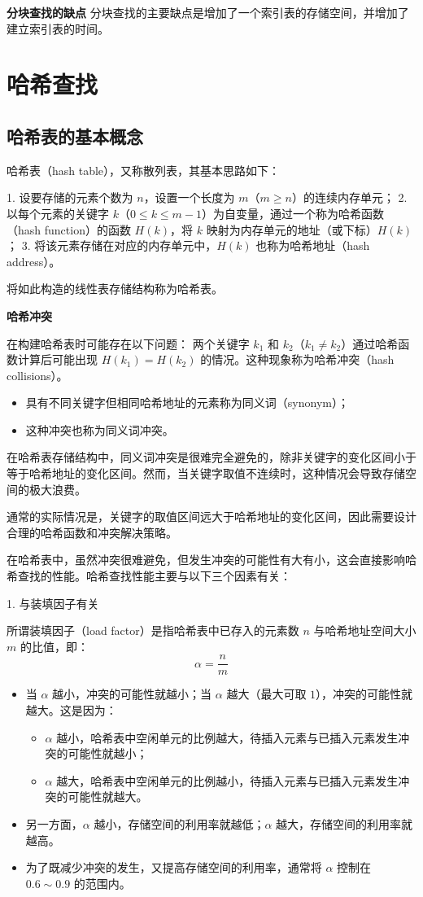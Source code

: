 \documentclass[lang=cn,newtx,10pt,scheme=chinese]{../elegantbook}
\begin{document}
\textbf{分块查找的缺点}  
分块查找的主要缺点是增加了一个索引表的存储空间，并增加了建立索引表的时间。
\section{哈希查找}
\subsection{哈希表的基本概念}

哈希表（hash table），又称散列表，其基本思路如下：

1. 设要存储的元素个数为 $n$，设置一个长度为 $m$（$m \geq n$）的连续内存单元；
2. 以每个元素的关键字 $k$（$0 \leq k \leq m-1$）为自变量，通过一个称为哈希函数（hash function）的函数 $H(k)$，将 $k$ 映射为内存单元的地址（或下标）$H(k)$；
3. 将该元素存储在对应的内存单元中，$H(k)$ 也称为哈希地址（hash address）。

将如此构造的线性表存储结构称为哈希表。


\textbf{哈希冲突}  

在构建哈希表时可能存在以下问题：  
两个关键字 $k_1$ 和 $k_2$（$k_1 \neq k_2$）通过哈希函数计算后可能出现 $H(k_1) = H(k_2)$ 的情况。这种现象称为哈希冲突（hash collisions）。  
\begin{itemize}
  \item 具有不同关键字但相同哈希地址的元素称为同义词（synonym）；
  \item 这种冲突也称为同义词冲突。
\end{itemize}

在哈希表存储结构中，同义词冲突是很难完全避免的，除非关键字的变化区间小于等于哈希地址的变化区间。然而，当关键字取值不连续时，这种情况会导致存储空间的极大浪费。

通常的实际情况是，关键字的取值区间远大于哈希地址的变化区间，因此需要设计合理的哈希函数和冲突解决策略。

在哈希表中，虽然冲突很难避免，但发生冲突的可能性有大有小，这会直接影响哈希查找的性能。哈希查找性能主要与以下三个因素有关：
  
  1. 与装填因子有关  

     所谓装填因子（load factor）是指哈希表中已存入的元素数 $n$ 与哈希地址空间大小 $m$ 的比值，即：
     \[
     \alpha = \frac{n}{m}
     \]
     \begin{itemize}
       \item 当 $\alpha$ 越小，冲突的可能性就越小；当 $\alpha$ 越大（最大可取 $1$），冲突的可能性就越大。这是因为：
         \begin{itemize}
           \item $\alpha$ 越小，哈希表中空闲单元的比例越大，待插入元素与已插入元素发生冲突的可能性就越小；
           \item $\alpha$ 越大，哈希表中空闲单元的比例越小，待插入元素与已插入元素发生冲突的可能性就越大。
         \end{itemize}
       \item 另一方面，$\alpha$ 越小，存储空间的利用率就越低；$\alpha$ 越大，存储空间的利用率就越高。
       \item 为了既减少冲突的发生，又提高存储空间的利用率，通常将 $\alpha$ 控制在 $0.6 \sim 0.9$ 的范围内。
     \end{itemize}
  
\end{document}
